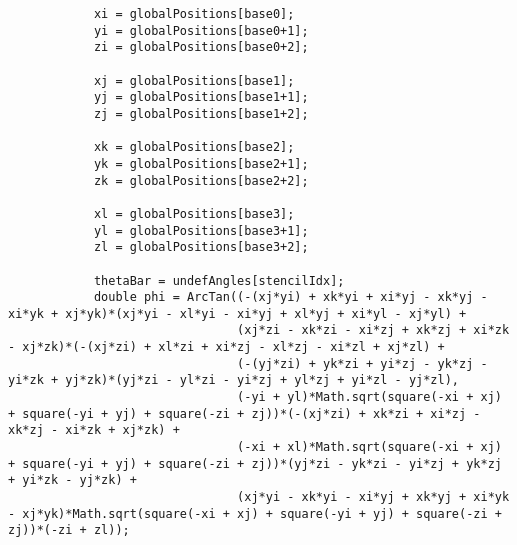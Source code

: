 \begin{lstlisting}
			xi = globalPositions[base0];
			yi = globalPositions[base0+1];
			zi = globalPositions[base0+2];
			
			xj = globalPositions[base1];
			yj = globalPositions[base1+1];
			zj = globalPositions[base1+2];
			
			xk = globalPositions[base2];
			yk = globalPositions[base2+1];
			zk = globalPositions[base2+2];
			
			xl = globalPositions[base3];
			yl = globalPositions[base3+1];
			zl = globalPositions[base3+2];
			
			thetaBar = undefAngles[stencilIdx];
			double phi = ArcTan((-(xj*yi) + xk*yi + xi*yj - xk*yj - xi*yk + xj*yk)*(xj*yi - xl*yi - xi*yj + xl*yj + xi*yl - xj*yl) + 
								(xj*zi - xk*zi - xi*zj + xk*zj + xi*zk - xj*zk)*(-(xj*zi) + xl*zi + xi*zj - xl*zj - xi*zl + xj*zl) + 
								(-(yj*zi) + yk*zi + yi*zj - yk*zj - yi*zk + yj*zk)*(yj*zi - yl*zi - yi*zj + yl*zj + yi*zl - yj*zl),
								(-yi + yl)*Math.sqrt(square(-xi + xj) + square(-yi + yj) + square(-zi + zj))*(-(xj*zi) + xk*zi + xi*zj - xk*zj - xi*zk + xj*zk) + 
								(-xi + xl)*Math.sqrt(square(-xi + xj) + square(-yi + yj) + square(-zi + zj))*(yj*zi - yk*zi - yi*zj + yk*zj + yi*zk - yj*zk) + 
								(xj*yi - xk*yi - xi*yj + xk*yj + xi*yk - xj*yk)*Math.sqrt(square(-xi + xj) + square(-yi + yj) + square(-zi + zj))*(-zi + zl));


\end{lstlisting}
